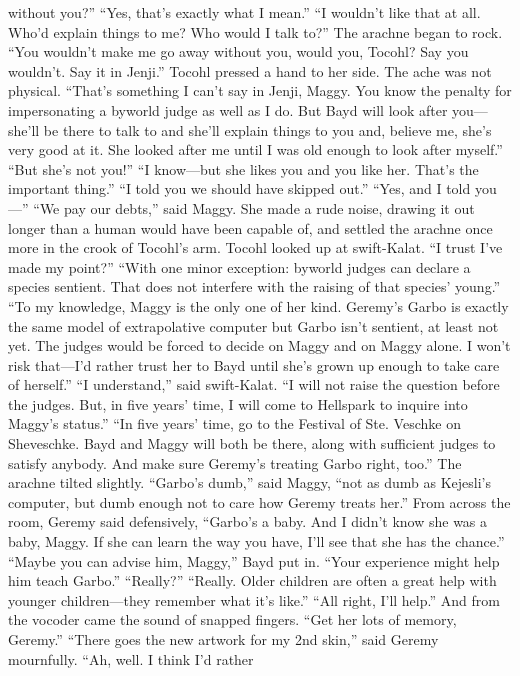 \documentclass[9pt]{article}
\begin{document}
without you?”
“Yes, that’s exactly what I mean.”
“I wouldn’t like that at all. Who’d explain things to me? Who would I talk to?” The arachne began to
rock. “You wouldn’t make me go away without you, would you, Tocohl? Say you wouldn’t. Say it in
Jenji.”
Tocohl pressed a hand to her side. The ache was not physical. “That’s something I can’t say in Jenji,
Maggy. You know the penalty for impersonating a byworld judge as well as I do. But Bayd will look
after you—she’ll be there to talk to and she’ll explain things to you and, believe me, she’s very good at it.
She looked after me until I was old enough to look after myself.”
“But she’s not you!”
“I know—but she likes you and you like her. That’s the important thing.”
“I told you we should have skipped out.”
“Yes, and I told you—”
“We pay our debts,” said Maggy. She made a rude noise, drawing it out longer than a human would
have been capable of, and settled the arachne once more in the crook of Tocohl’s arm.
Tocohl looked up at swift-Kalat. “I trust I’ve made my point?”
“With one minor exception: byworld judges can declare a species sentient. That does not interfere
with the raising of that species’ young.”
“To my knowledge, Maggy is the only one of her kind. Geremy’s Garbo is exactly the same model of
extrapolative computer but Garbo isn’t sentient, at least not yet. The judges would be forced to decide
on Maggy and on Maggy alone. I won’t risk that—I’d rather trust her to Bayd until she’s grown up
enough to take care of herself.”
“I understand,” said swift-Kalat. “I will not raise the question before the judges. But, in five years’
time, I will come to Hellspark to inquire into Maggy’s status.”
“In five years’ time, go to the Festival of Ste. Veschke on Sheveschke. Bayd and Maggy will both be
there, along with sufficient judges to satisfy anybody. And make sure Geremy’s treating Garbo right,
too.”
The arachne tilted slightly. “Garbo’s dumb,” said Maggy, “not as dumb as Kejesli’s computer, but
dumb enough not to care how Geremy treats her.”
From across the room, Geremy said defensively, “Garbo’s a baby. And I didn’t know she was a
baby, Maggy. If she can learn the way you have, I’ll see that she has the chance.”
“Maybe you can advise him, Maggy,” Bayd put in. “Your experience might help him teach Garbo.”
“Really?”
“Really. Older children are often a great help with younger children—they remember what it’s like.”
“All right, I’ll help.” And from the vocoder came the sound of snapped fingers. “Get her lots of
memory, Geremy.”
“There goes the new artwork for my 2nd skin,” said Geremy mournfully. “Ah, well. I think I’d rather
\end{document}
